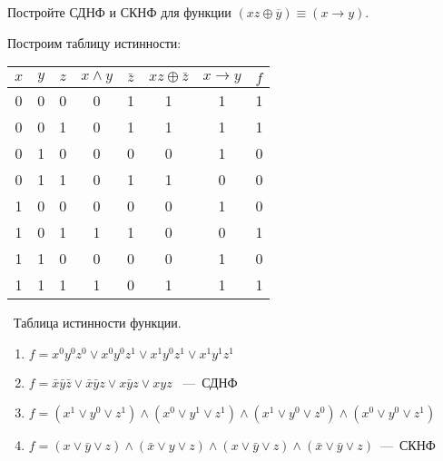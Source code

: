 
\setcounter{example}{0}

\begin{exercise}
Постройте СДНФ и СКНФ для функции $(xz\oplus\overline{y})\equiv(x\to y)$.
\end{exercise}

\begin{solution}
Построим таблицу истинности:\\



\begin{center}
 \begin{tabular}{| c c c | c | c | c | c | c |}
  \hline	
 $x$ & $y$ & $z$ & $x\wedge y$ & $\bar{z}$ & $xz\oplus \bar{z}$ & $x\rightarrow y$ & $f$\T\B \\
  \hline\hline
  0 & 0 & 0 & 0 & 1 & 1 & 1 & 1 \T\B \\ 
  0 & 0 & 1 & 0 & 1 & 1 & 1 & 1\B \\
  0 & 1 & 0 & 0 & 0 & 0 & 1 & 0\B \\
  0 & 1 & 1 & 0 & 1 & 1 & 0 & 0 \B \\
  1 & 0 & 0 & 0 & 0 & 0 & 1 & 0\B \\
  1 & 0 & 1 & 1 & 1 & 0 & 0 & 1 \B \\
  1 & 1 & 0 & 0 & 0 & 0 & 1 & 0 \B \\
  1 & 1 & 1 & 1 & 0 & 1 & 1 & 1 \B \\
  \hline
 \end{tabular} 
 \vspace{0,2 cm}
 
 \
 \small Таблица истинности функции.
 
 \end{center}
 \begin{enumerate}
\item $f=x^0y^0z^0\vee x^0y^0z^1\vee x^1y^0z^1\vee x^1y^1z^1$
\item $f=\bar{x}\bar{y}\bar{z}\vee \bar{x}\bar{y}z\vee x\bar{y}z\vee xyz$ ~---~СДНФ
\item$f=(x^1\vee y^0\vee z^1)\wedge(x^0\vee y^1\vee z^1 )\wedge(x^1\vee y^0\vee z^0)\wedge(x^0\vee y^0\vee z^1)$
\item$f=(x\vee \bar{y}\vee z)\wedge(\bar{x}\vee y\vee z)\wedge(x\vee \bar{y}\vee z)\wedge(\bar{x}\vee \bar{y}\vee z)$~---~СКНФ
 \end{enumerate}
 
\end{solution}

